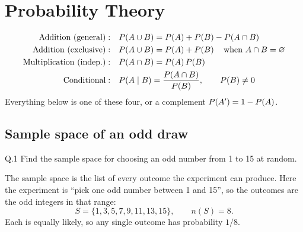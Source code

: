 \chapter{Probability Theory}


\begin{keyidea}
\begin{align*}
\text{Addition (general)}    &: && \prob{A\cup B}=\prob{A}+\prob{B}-\prob{A\cap B}\\
\text{Addition (exclusive)}  &: && \prob{A\cup B}=\prob{A}+\prob{B} \quad\text{when } A\cap B=\varnothing\\
\text{Multiplication (indep.)}&: && \prob{A\cap B}=\prob{A}\prob{B}\\
\text{Conditional}           &: && \prob{A\mid B}=\frac{\prob{A\cap B}}{\prob{B}},\qquad \prob{B}\neq 0
\end{align*}
Everything below is one of these four, or a complement $P\!\left(A'\right)=1-P\!\left(A\right)$.
\end{keyidea}

\section{Sample space of an odd draw}

\begin{question}{Q.1}
Find the sample space for choosing an odd number from 1 to 15 at random.
\end{question}

\begin{solution}
The sample space is the list of every outcome the experiment can produce.
Here the experiment is ``pick one odd number between 1 and 15'', so the
outcomes are the odd integers in that range:
\[
S=\{1,3,5,7,9,11,13,15\},\qquad n(S)=8 .
\]
Each is equally likely, so any single outcome has probability $1/8$.

\end{solution}

